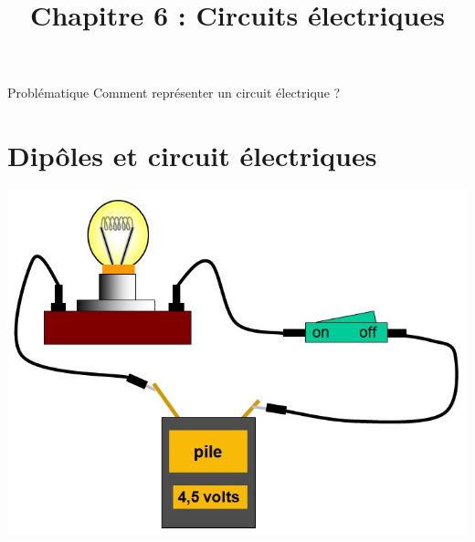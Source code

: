\documentclass[xcolor={dvipsnames}]{beamer}
\title[Ch 6 : Circuits électriques]{Chapitre 6 : Circuits électriques}
\begin{document}
\begin{frame}
  \titlepage 
\end{frame}


\begin{frame}
\begin{block}{Problématique}
	{\Large Comment représenter un circuit électrique ?}
\end{block}
\end{frame}


\section{Dipôles et circuit électriques}

\begin{frame}
	
	
	
\end{frame}

\begin{frame}
\begin{center}
	\includegraphics[scale=0.35]{../img/circuitsimple}
\end{center}
\end{frame}
\end{document}
